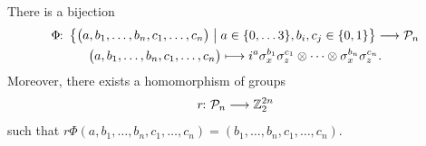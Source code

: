 \documentclass[a4paper, oneside, 12pt]{amsart}
\newcommand*{\PauliGroup}{\ensuremath{\mathcal{P}}}
\begin{document}
\begin{lemma}\label{lem:bijection-Pauli-n-group-matrices}
  There is a bijection
  \begin{equation}
    \begin{gathered}
      \Phi \from \left\{
        \begin{pmatrix}
          a, b_{1}, \dots, b_{n}, c_{1}, \dots, c_{n}
        \end{pmatrix}
        \;\middle|\;
        a \in\{0, \dots 3\}, b_{i}, c_{j} \in\{0,1\} \right\} \to \PauliGroup_{n}\\
      \begin{pmatrix}
        a , b_{1} , \dots , b_{n} , c_{1} , \dots , c_{n}
      \end{pmatrix}  \mapsto i^{a} \sigma_{x}^{b_{1}}\sigma_{z}^{c_{1}} \otimes \dots \otimes \sigma_{x}^{b_{n}}\sigma_{z}^{c_{n}}.
    \end{gathered}
  \end{equation}
  Moreover, there exists a homomorphism of groups
  \begin{equation}
    r \from \PauliGroup_{n} \to \mathbb{Z}_{2}^{2n}
  \end{equation}
  such that \(r\Phi(a, b_{1}, \dots , b_{n}, c_{1}, \dots , c_{n}) = (b_{1}, \dots , b_{n}, c_{1}, \dots , c_{n})\).
\end{lemma}
\end{document}
